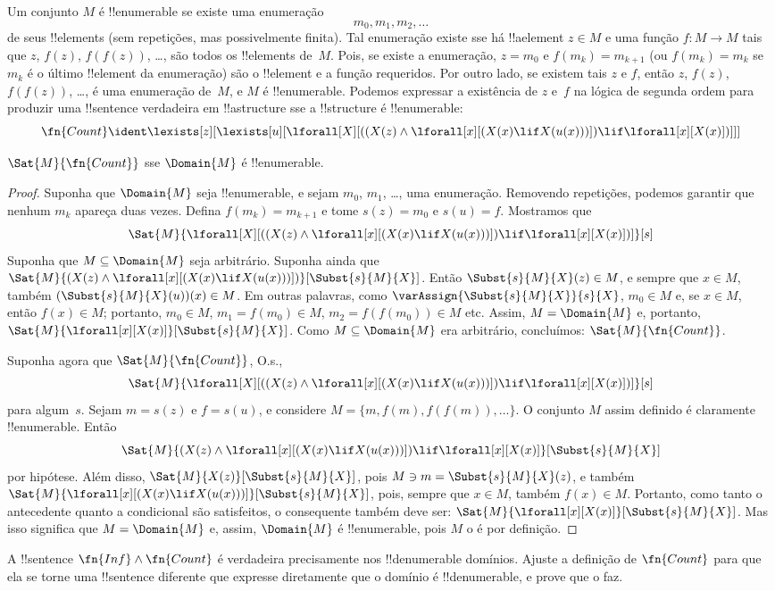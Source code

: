\documentclass[../../../include/open-logic-section]{subfiles}
\begin{document}
Um conjunto $M$ é !!{enumerable} se existe uma enumeração
\[
m_0, m_1, m_2, \dots
\]
de seus !!{element}s (sem repetições, mas possivelmente finita). Tal
enumeração existe sse há !!a{element} $z \in M$ e uma função
$f\colon M \to M$ tais que $z$, $f(z)$, $f(f(z))$, \dots, são todos os
!!{element}s de~$M$. Pois, se existe a enumeração, $z = m_0$ e
$f(m_k) = m_{k+1}$ (ou $f(m_k) = m_k$ se $m_k$ é o último !!{element} da
enumeração) são o !!{element} e a função requeridos. Por outro lado, se
existem tais $z$ e $f$, então $z$, $f(z)$, $f(f(z))$, \dots, é uma
enumeração de~$M$, e $M$ é !!{enumerable}. Podemos expressar a existência de
$z$ e~$f$ na lógica de segunda ordem para produzir uma !!{sentence}
verdadeira em !!a{structure} sse a !!{structure} é !!{enumerable}:
\[
\fn{Count} \ident
\lexists[z][\lexists[u][\lforall[X][((X(z) \land
      \lforall[x][(X(x) \lif X(u(x)))]) \lif \lforall[x][X(x)])]]]
\]

\begin{prop}
$\Sat{M}{\fn{Count}}$ sse $\Domain{M}$ é !!{enumerable}.
\end{prop}

\begin{proof}
Suponha que $\Domain{M}$ seja !!{enumerable}, e sejam $m_0$, $m_1$, \dots,
uma enumeração. Removendo repetições, podemos garantir que nenhum $m_k$
apareça duas vezes. Defina $f(m_k) = m_{k+1}$ e tome $s(z) = m_0$ e
$s(u) = f$. Mostramos que
\[
\Sat{M}{\lforall[X][((X(z) \land \lforall[x][(X(x) \lif X(u(x)))])
    \lif \lforall[x][X(x)])]}[s]
\]
Suponha que $M \subseteq \Domain{M}$ seja arbitrário. Suponha ainda que
$\Sat{M}{(X(z) \land \lforall[x][(X(x) \lif
X(u(x)))])}[\Subst{s}{M}{X}]$. Então $\Subst{s}{M}{X}(z) \in M$, e sempre
que $x \in M$, também $(\Subst{s}{M}{X}(u))(x) \in M$. Em outras palavras,
como $\varAssign{\Subst{s}{M}{X}}{s}{X}$, $m_0 \in M$ e, se $x \in M$,
então $f(x) \in M$; portanto, $m_0 \in M$, $m_1 = f(m_0) \in M$,
$m_2 = f(f(m_0)) \in M$ etc. Assim, $M = \Domain{M}$ e, portanto,
$\Sat{M}{\lforall[x][X(x)]}[\Subst{s}{M}{X}]$. Como
$M \subseteq \Domain{M}$ era arbitrário, concluímos:
$\Sat{M}{\fn{Count}}$.

Suponha agora que $\Sat{M}{\fn{Count}}$, O.s.\@,
\[
\Sat{M}{\lforall[X][((X(z) \land \lforall[x][(X(x) \lif X(u(x)))])
    \lif \lforall[x][X(x)])]}[s]
\]
para algum~$s$. Sejam $m = s(z)$ e $f = s(u)$, e considere
$M = \{m, f(m), f(f(m)), \dots\}$. O conjunto $M$ assim definido é
claramente !!{enumerable}. Então
\[
\Sat{M}{(X(z) \land \lforall[x][(X(x) \lif X(u(x)))])
    \lif \lforall[x][X(x)]}[\Subst{s}{M}{X}]
\]
por hipótese. Além disso, $\Sat{M}{X(z)}[\Subst{s}{M}{X}]$, pois $M \ni m =
\Subst{s}{M}{X}(z)$, e também
$\Sat{M}{\lforall[x][(X(x) \lif X(u(x)))]}[\Subst{s}{M}{X}]$, pois, sempre
que $x \in M$, também $f(x) \in M$. Portanto, como tanto o antecedente
quanto a condicional são satisfeitos, o consequente também deve ser:
$\Sat{M}{\lforall[x][X(x)]}[\Subst{s}{M}{X}]$. Mas isso significa que
$M = \Domain{M}$ e, assim, $\Domain{M}$ é !!{enumerable}, pois $M$ o é por
definição.
\end{proof}

\begin{prob}
A !!{sentence} $\fn{Inf} \land \fn{Count}$ é verdadeira precisamente nos
!!{denumerable} domínios. Ajuste a definição de $\fn{Count}$ para que ela se
torne uma !!{sentence} diferente que expresse diretamente que o domínio é
!!{denumerable}, e prove que o faz.
\end{prob}
\end{document}
